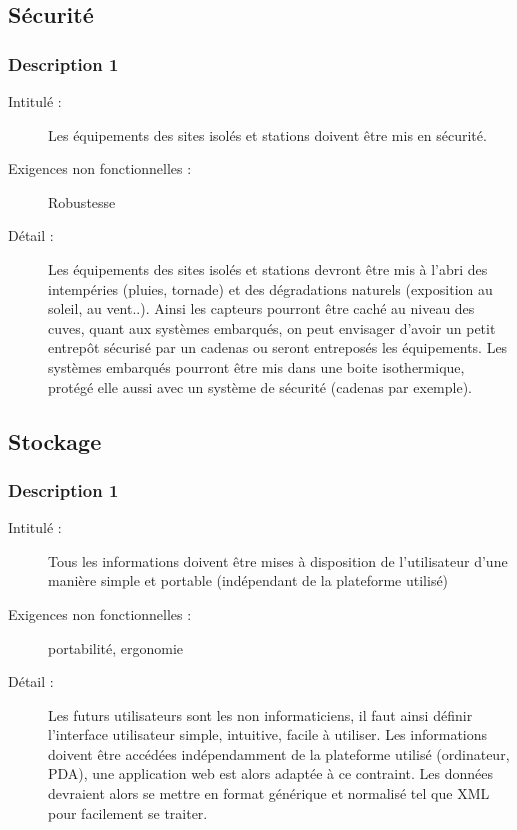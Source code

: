\documentclass[11pt]{article}
\begin{document}
\subsection {Sécurité}
 \subsubsection {Description 1}
\begin{description}
           \item[Intitulé :] Les équipements des sites isolés et stations doivent être mis en sécurité.
           \item[Exigences non fonctionnelles :] Robustesse
           \item[Détail :] Les équipements des sites isolés et stations devront être mis à l'abri des intempéries (pluies, tornade) 
et des dégradations naturels (exposition au soleil, au vent..). Ainsi les capteurs pourront être caché au niveau 
des cuves, quant aux systèmes embarqués, on peut envisager d'avoir un petit entrepôt sécurisé par un cadenas ou 
seront entreposés les équipements. Les systèmes embarqués pourront être mis dans une boite isothermique, 
protégé elle aussi avec un système de sécurité (cadenas par exemple).
\end{description}

\subsection {Stockage}
 \subsubsection {Description 1}
\begin{description}
           \item[Intitulé :] Tous les informations doivent être mises à disposition de l'utilisateur d'une manière simple et portable (indépendant de la plateforme utilisé)
           \item[Exigences non fonctionnelles :] portabilité,  ergonomie
           \item[Détail :] Les futurs utilisateurs sont les non informaticiens, il faut ainsi définir l’interface utilisateur simple, intuitive, facile à utiliser. Les informations doivent être accédées indépendamment de la plateforme utilisé (ordinateur, PDA), une application web est alors adaptée à ce contraint.  Les données devraient alors se mettre en format générique et normalisé tel que XML pour facilement se traiter.
\end{description}
\end{document}
